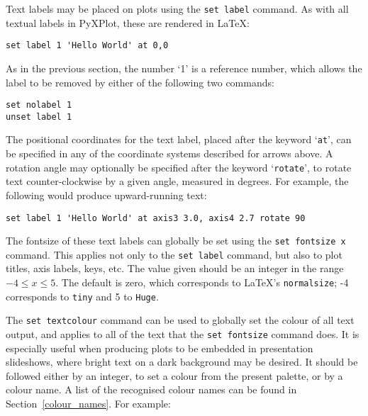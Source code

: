\documentclass[a4paper,onecolumn,11pt]{book}
\begin{document}
Text labels may be placed on plots using the \texttt{set label}
command. As with all
textual labels in PyXPlot, these are rendered in \LaTeX:

\begin{verbatim}
set label 1 'Hello World' at 0,0
\end{verbatim}

As in the previous section, the number `1' is a reference number, which allows
the label to be removed by either of the following two commands:

\begin{verbatim}
set nolabel 1
unset label 1
\end{verbatim}

\noindent The positional coordinates for the text label, placed after the
keyword `\texttt{at}', can be specified in any of the coordinate systems
described for arrows above. A rotation angle may optionally be specified after
the keyword `{\tt rotate}', to rotate text counter-clockwise by a given
angle, measured in degrees. For example, the following would produce
upward-running text:

\begin{verbatim}
set label 1 'Hello World' at axis3 3.0, axis4 2.7 rotate 90
\end{verbatim}

 The fontsize of these text labels can globally be set using
the \texttt{set fontsize x} command. This applies not only to the \texttt{set
label} command, but also to plot titles, axis labels, keys, etc. The value
given should be an integer in the range $-4 \leq x \leq 5$. The default is
zero, which corresponds to \LaTeX's \texttt{normalsize}; -4 corresponds to
\texttt{tiny} and 5 to \texttt{Huge}.

 The \texttt{set textcolour} command
can be used to globally set the colour of all text output, and applies to all
of the text that the \texttt{set fontsize} command does. It is especially
useful when producing plots to be embedded in presentation slideshows, where
bright text on a dark background may be desired. It should be followed either
by an integer, to set a colour from the present palette, or by a colour name. A
list of the recognised colour names can be found in Section~\ref{colour_names}.
For example:
\end{document}
